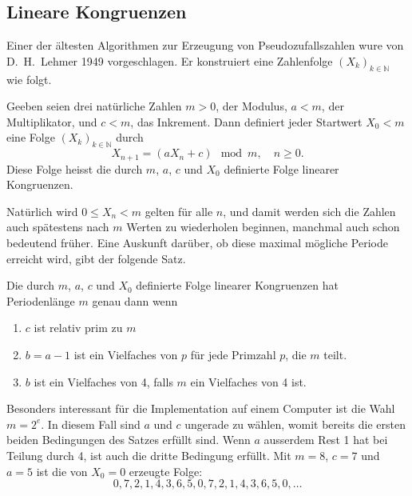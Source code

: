 \subsection{Lineare Kongruenzen}
Einer der ältesten Algorithmen zur Erzeugung von Pseudozufallszahlen
wure von D.~H.~Lehmer 1949 vorgeschlagen.
Er konstruiert eine Zahlenfolge
$(X_k)_{k\in\mathbb{N}}$
wie folgt.
\begin{definition}
Geeben seien drei natürliche Zahlen $m>0$, der Modulus, $a < m$, der
Multiplikator, und $c< m$, das Inkrement.
Dann definiert jeder Startwert
$X_0<m$ eine Folge $(X_k)_{k\in\mathbb{N}}$ durch
\begin{equation}
X_{n+1}=(aX_n+c)\mod m,\quad\text{$n\ge 0$}.
\end{equation}
Diese Folge heisst die durch $m$, $a$, $c$ und $X_0$ definierte Folge
linearer Kongruenzen.
\end{definition}
Natürlich wird $0\le X_n <m$ gelten für alle $n$, und damit
werden sich die Zahlen auch spätestens nach $m$ Werten zu wiederholen
beginnen, manchmal auch schon bedeutend früher.
Eine Auskunft darüber, ob diese maximal mögliche Periode erreicht wird,
gibt der folgende Satz.

\begin{satz}
Die durch $m$, $a$, $c$ und $X_0$ definierte Folge linearer Kongruenzen
hat Periodenlänge $m$ genau dann wenn
\begin{enumerate}
\item $c$ ist relativ prim zu $m$
\item $b=a-1$ ist ein Vielfaches von $p$ für jede Primzahl $p$, die $m$
teilt.
\item $b$ ist ein Vielfaches von 4, falls $m$ ein Vielfaches von 4 ist.
\end{enumerate}
\end{satz}

Besonders interessant für die Implementation auf einem Computer ist die
Wahl $m=2^e$.
In diesem Fall sind $a$ und $c$ ungerade zu wählen, womit
bereits die ersten beiden Bedingungen des Satzes erfüllt sind.
Wenn
$a$ ausserdem Rest 1 hat bei Teilung durch 4, ist auch die dritte Bedingung
erfüllt.
Mit $m=8$, $c=7$ und $a=5$ ist die von $X_0=0$ erzeugte Folge:
\[
 0, 7, 2, 1, 4, 3, 6, 5, 0, 7, 2, 1, 4, 3, 6, 5, 0, \dots
\]

